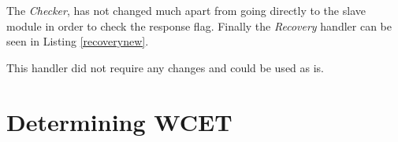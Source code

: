 

The \textit{Checker}, has not changed much apart from going directly to the slave module in order to check the response flag. Finally the \textit{Recovery} handler can be seen in Listing \ref{recoverynew}.



This handler did not require any changes and could be used as is.

\section{Determining WCET}

